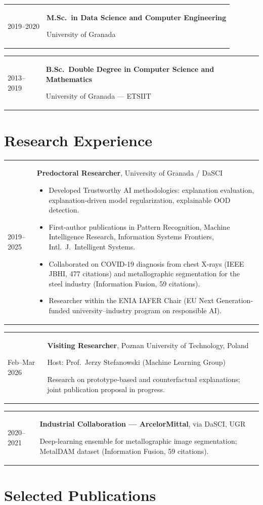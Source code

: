 \documentclass[11pt,a4paper]{article}
\makeatletter
\newcommand{\entry}[2]{%
  \noindent
  \begin{tabularx}{\textwidth}{@{}p{0.18\textwidth}@{\hspace{0.02\textwidth}}X@{}}
    #1 & #2
  \end{tabularx}
  \par\vspace{0.15em}
}
\newcommand{\subt}[1]{{\color{subtitle}\small #1}\par}
\makeatother
\begin{document}
\entry{2019--2020}{%
  \textbf{M.Sc.~in Data Science and Computer Engineering} \par
  \subt{University of Granada}
}

\entry{2013--2019}{%
  \textbf{B.Sc.~Double Degree in Computer Science and Mathematics} \par
  \subt{University of Granada --- ETSIIT}
}

\section*{Research Experience}

\entry{2019--2025}{%
  \textbf{Predoctoral Researcher}, University of Granada / DaSCI \par
  \begin{itemize}
    \item Developed Trustworthy AI methodologies: explanation evaluation, explanation-driven model regularization, explainable OOD detection.
    \item First-author publications in Pattern Recognition, Machine Intelligence Research, Information Systems Frontiers, Intl.~J.~Intelligent Systems.
    \item Collaborated on COVID-19 diagnosis from chest X-rays (IEEE JBHI, 477 citations) and metallographic segmentation for the steel industry (Information Fusion, 59 citations).
    \item Researcher within the ENIA IAFER Chair (EU Next Generation-funded university--industry program on responsible AI).
  \end{itemize}
}

\entry{Feb--Mar 2026}{%
  \textbf{Visiting Researcher}, Poznan University of Technology, Poland \par
  \subt{Host: Prof.~Jerzy Stefanowski (Machine Learning Group)} \par
  \subt{Research on prototype-based and counterfactual explanations; joint publication proposal in progress.}
}

\entry{2020--2021}{%
  \textbf{Industrial Collaboration --- ArcelorMittal}, via DaSCI, UGR \par
  \subt{Deep-learning ensemble for metallographic image segmentation; MetalDAM dataset (Information Fusion, 59 citations).}
}

\section*{Selected Publications}
\end{document}
